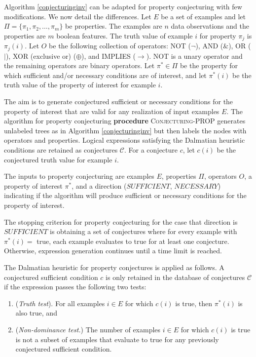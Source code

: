 \documentclass[ijds,nonblindrev]{informs-ijds}
\begin{document}
Algorithm \ref{conjecturinginv} can be adapted for property conjecturing with few modifications.  We now detail the differences.  Let $E$ be a set of examples and let $\Pi = \{\pi_1, \pi_2, \ldots, \pi_m\}$ be properties.  The examples are $n$ data observations and the properties are $m$ boolean features.  The truth value of example $i$ for property $\pi_j$ is $\pi_j(i)$.  Let $O$ be the following collection of operators: NOT ($\neg$), AND ($\&$), OR ($|$), XOR (exclusive or) ($\oplus$), and IMPLIES ($\rightarrow$).  NOT is a unary operator and the remaining operators are binary operators.  Let $\pi^* \in \Pi$ be the property for which sufficient and/or necessary conditions are of interest, and let $\pi^*(i)$ be the truth value of the property of interest for example $i$.  

The aim is to generate conjectured sufficient or necessary conditions for the property of interest that are valid for any realization of input examples $E$.  The algorithm for property conjecturing {\bf procedure} \textsc{Conjecturing-PROP} generates unlabeled trees as in Algorithm \ref{conjecturinginv} but then labels the nodes with operators and properties.  Logical expressions satisfying the Dalmatian heuristic conditions are retained as conjectures $\mathcal{C}$.  For a conjecture $c$, let $c(i)$ be the conjectured truth value for example $i$.  

The inputs to property conjecturing are examples $E$, properties $\Pi$, operators $O$, a property of interest $\pi^*$, and a direction ($SUFFICIENT$, $NECESSARY$) indicating if the algorithm will produce sufficient or necessary conditions for the property of interest.

The stopping criterion for property conjecturing for the case that direction is $SUFFICIENT$ is obtaining a set of conjectures where for every example with $\pi^*(i) = $ true, each example evaluates to true for at least one conjecture.  Otherwise, expression generation continues until a time limit is reached.

The Dalmatian heuristic for property conjectures is applied as follows.  A conjectured sufficient condition $c$ is only retained in the database of conjectures $\mathcal{C}$ if the expression passes the following two tests:
\begin{enumerate}
\item (\textit{Truth test}). For all examples $i \in E$ for which $c(i)$ is true, then $\pi^*(i)$ is also true, and
\item (\textit{Non-dominance test.})
The number of examples $i \in E$ for which $c(i)$ is true is not a subset of examples that evaluate to true for any previously conjectured sufficient condition.
\end{enumerate}
\end{document}
